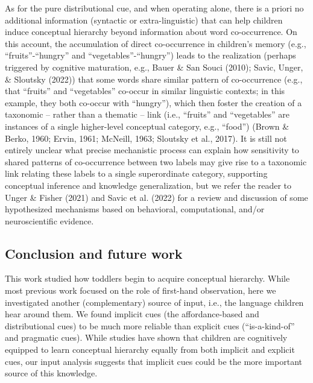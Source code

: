 \documentclass[english,,man]{apa6}
\begin{document}
As for the pure distributional cue, and when operating alone, there is a priori no additional information (syntactic or extra-linguistic) that can help children induce conceptual hierarchy beyond information about word co-occurrence. On this account, the accumulation of direct co-occurrence in children's memory (e.g., \enquote{fruits}-\enquote{hungry} and \enquote{vegetables}-\enquote{hungry}) leads to the realization (perhaps triggered by cognitive maturation, e.g., Bauer \& San Souci (2010); Savic, Unger, \& Sloutsky (2022)) that some words share similar pattern of co-occurrence (e.g., that \enquote{fruits} and \enquote{vegetables} co-occur in similar linguistic contexts; in this example, they both co-occur with \enquote{hungry}), which then foster the creation of a taxonomic -- rather than a thematic -- link (i.e., \enquote{fruits} and \enquote{vegetables} are instances of a single higher-level conceptual category, e.g., \enquote{food}) (Brown \& Berko, 1960; Ervin, 1961; McNeill, 1963; Sloutsky et al., 2017). It is still not entirely unclear what precise mechanistic process can explain how sensitivity to shared patterns of co-occurrence between two labels may give rise to a taxonomic link relating these labels to a single superordinate category, supporting conceptual inference and knowledge generalization, but we refer the reader to Unger \& Fisher (2021) and Savic et al. (2022) for a review and discussion of some hypothesized mechanisms based on behavioral, computational, and/or neuroscientific evidence.

\hypertarget{conclusion-and-future-work}{%
\subsection{Conclusion and future work}\label{conclusion-and-future-work}}

This work studied how toddlers begin to acquire conceptual hierarchy. While most previous work focused on the role of first-hand observation, here we investigated another (complementary) source of input, i.e., the language children hear around them. We found implicit cues (the affordance-based and distributional cues) to be much more reliable than explicit cues (\enquote{is-a-kind-of} and pragmatic cues). While studies have shown that children are cognitively equipped to learn conceptual hierarchy equally from both implicit and explicit cues, our input analysis suggests that implicit cues could be the more important source of this knowledge.
\end{document}
